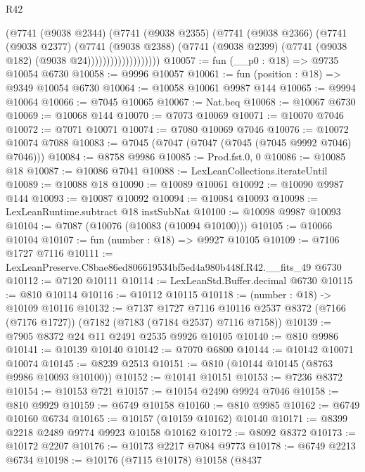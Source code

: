 \begin{lexlean}{R42}
\begin{coremodule}
{                          (@7741
                            (@9038 @2344)
                            (@7741
                              (@9038 @2355)
                              (@7741
                                (@9038 @2366)
                                (@7741
                                  (@9038 @2377)
                                  (@7741
                                    (@9038 @2388)
                                    (@7741
                                      (@9038 @2399)
                                      (@7741 (@9038 @182) (@9038 @24)))))))))))))))))))
@10057 := fun (__p0 : @18) => @9735 @10054 @6730
@10058 := @9996 @10057
@10061 := fun (position : @18) => @9349 @10054 @6730
@10064 := @10058 @10061 @9987 @144
@10065 := @9994 @10064
@10066 := @7045 @10065
@10067 := Nat.beq
@10068 := @10067 @6730
@10069 := @10068 @144
@10070 := @7073 @10069
@10071 := @10070 @7046
@10072 := @7071 @10071
@10074 := @7080 @10069 @7046
@10076 := @10072 @10074 @7088
@10083 := @7045 (@7047 (@7047 (@7045 (@7045 @9992 @7046) @7046)))
@10084 := @8758 @9986
@10085 := Prod.fst.{0, 0}
@10086 := @10085 @18
@10087 := @10086 @7041
@10088 := LexLeanCollections.iterateUntil
@10089 := @10088 @18
@10090 := @10089 @10061
@10092 := @10090 @9987 @144
@10093 := @10087 @10092
@10094 := @10084 @10093
@10098 := LexLeanRuntime.subtract @18 instSubNat
@10100 := @10098 @9987 @10093
@10104 := @7087 (@10076 (@10083 (@10094 @10100)))
@10105 := @10066 @10104
@10107 := fun (number : @18) => @9927 @10105
@10109 := @7106 @1727 @7116
@10111 := LexLeanPreserve.C8bae86ed806619534bf5ed4a980b448f.R42.__fits_49 @6730
@10112 := @7120 @10111
@10114 := LexLeanStd.Buffer.decimal @6730
@10115 := @810 @10114
@10116 := @10112 @10115
@10118 := (number : @18) -> @10109 @10116
@10132 := @7137
    @1727
    @7116
    @10116
    @2537
    @8372
    (@7166 (@7176 @1727))
    (@7182 (@7183 (@7184 @2537) @7116 @7158))
@10139 := @7905 @8372 @24 @11 @2491 @2535 @9926 @10105
@10140 := @810 @9986
@10141 := @10139 @10140
@10142 := @7070 @6800
@10144 := @10142 @10071 @10074
@10145 := @8239 @2513
@10151 := @810 (@10144 @10145 (@8763 @9986 @10093 @10100))
@10152 := @10141 @10151
@10153 := @7236 @8372
@10154 := @10153 @721
@10157 := @10154 @2490 @9924 @7046
@10158 := @810 @9929
@10159 := @6749 @10158
@10160 := @810 @9985
@10162 := @6749 @10160 @6734
@10165 := @10157 (@10159 @10162) @10140
@10171 := @8399 @2218 @2489 @9774 @9923 @10158 @10162
@10172 := @8092 @8372
@10173 := @10172 @2207
@10176 := @10173 @2217 @7084 @9773
@10178 := @6749 @2213 @6734
@10198 := @10176
    (@7115 @10178)
    @10158
    (@8437
}
\end{coremodule}
\end{lexlean}
